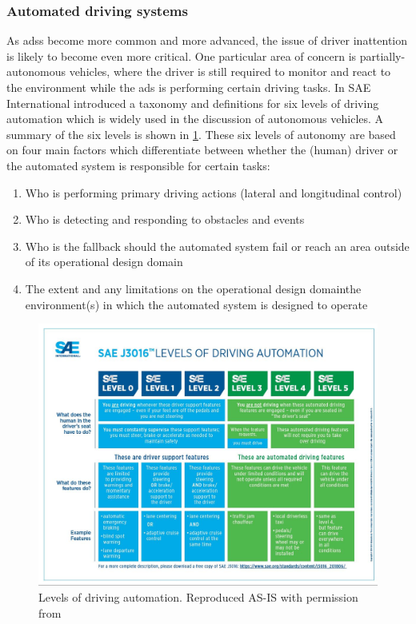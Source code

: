 \documentclass[11pt, parskip=half*,twoside=false]{scrbook}
\begin{document}
\subsubsection{Automated driving systems}
As \glspl{ads} become more common and more advanced, the issue of driver inattention is likely to become even more critical. One particular area of concern is partially-autonomous vehicles, where the driver is still required to monitor and react to the environment while the \gls{ads} is performing certain driving tasks.  In \citep{J3016_201806} SAE International introduced a taxonomy and definitions for six levels of driving automation which is widely used in the discussion of autonomous vehicles. A summary of the six levels is shown in \cref{fig:av_levels}. These six levels of autonomy are based on four main factors which differentiate between whether the (human) driver or the automated system is responsible for certain tasks: 

\begin{enumerate}
	\item Who is performing primary driving actions (lateral and longitudinal control) 
	\item Who is detecting and responding to obstacles and events
	\item Who is the fallback should the automated system fail or reach an area outside of its operational design domain
	\item The extent and any limitations on the operational design domain\textemdash the environment(s) in which the automated system is designed to operate
\end{enumerate}

\begin{figure} 
	\centering
	\includegraphics[width= \textwidth]{sae_av_levels} 
	\caption{Levels of driving automation. Reproduced AS-IS with permission from \citet{J3016_201806}}
	\label{fig:av_levels}
\end{figure}
\end{document}

